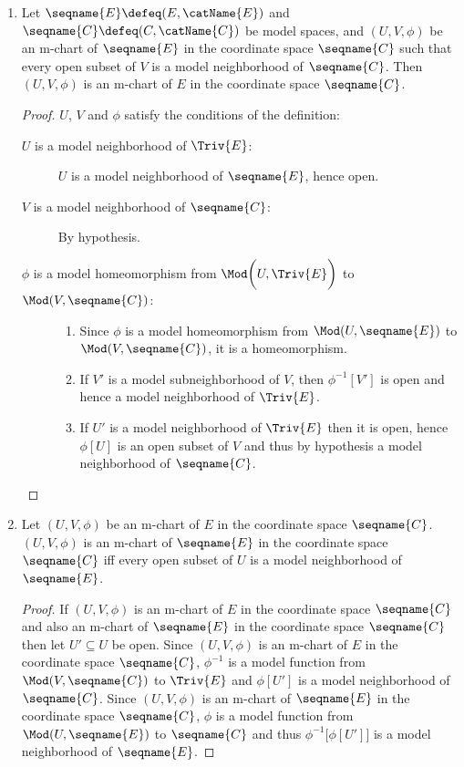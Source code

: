 \documentclass{article}
\begin{document}
\begin{lemma}[M-charts]
\label{lem:M-chart}
\leavevmode
\begin{enumerate}
\item
\label{M-chart:openC}
Let $\seqname{E} \defeq (E, \catName{E})$ and
$\seqname{C} \defeq (C,\catName{C})$ be model spaces, and $(U, V, \phi)$
be an m-chart of $\seqname{E}$ in the coordinate space $\seqname{C}$
such that every open subset of $V$ is a model neighborhood of
$\seqname{C}$. Then $(U, V, \phi)$ is an m-chart of $E$ in the
coordinate space $\seqname{C}$.

\begin{proof}
$U$, $V$ and $\phi$ satisfy the conditions of the definition:
\begin{description}
\item%
  [
    $U$ is a model neighborhood of \ensuremath{\Triv{E}}:
  ]
$U$ is a model neighborhood of $\seqname{E}$, hence open.

\item[$V$ is a model neighborhood of $\seqname{C}$:]
By hypothesis.

\item%
  [
    $\phi$ is a model homeomorphism from
    \ensuremath{\Mod \biggl ( U,\Triv{E} \biggr )} to
    $\Mod(V,\seqname{C})$:
  ]
\leavevmode
\begin{enumerate}
\item
Since $\phi$ is a model homeomorphism from $\Mod(U,\seqname{E})$ to
$\Mod(V,\seqname{C})$, it is a homeomorphism.

\item
If $V'$ is a model subneighborhood of $V$, then $\phi^{-1}[V']$ is open
and hence a model neighborhood of $\Triv{E}$.

\item
If $U'$ is a model neighborhood of $\Triv{E}$ then it is open, hence
$\phi[U]$ is an open subset of $V$ and thus by hypothesis a model
neighborhood of $\seqname{C}$.
\end{enumerate}
\end{description}
\end{proof}

\item
\label{M-chart:openE}
Let $(U, V, \phi)$ be an m-chart of $E$ in the coordinate space
$\seqname{C}$. $(U, V, \phi)$ is an m-chart of $\seqname{E}$ in the
coordinate space $\seqname{C}$ iff every open subset of $U$ is a model
neighborhood of $\seqname{E}$.

\begin{proof}
If $(U, V, \phi)$ is an m-chart of $E$ in the coordinate space
$\seqname{C}$ and also an m-chart of $\seqname{E}$ in the coordinate
space $\seqname{C}$ then let $U' \subseteq U$ be open. Since
$(U, V, \phi)$ is an m-chart of $E$ in the coordinate space
$\seqname{C}$, $\phi^{-1}$ is a model function from
$\Mod(V,\seqname{C})$ to $\Triv{E}$ and $\phi[U']$ is a model
neighborhood of $\seqname{C}$.  Since $(U, V, \phi)$ is an m-chart of
$\seqname{E}$ in the coordinate space $\seqname{C}$, $\phi$ is a model
function from $\Mod(U,\seqname{E})$ to $\seqname{C}$ and thus
$\phi^{-1} \bigl [ \phi[U'] \bigr ]$ is a model neighborhood of $\seqname{E}$.


\end{proof}
\end{enumerate}
\end{lemma}
\end{document}
